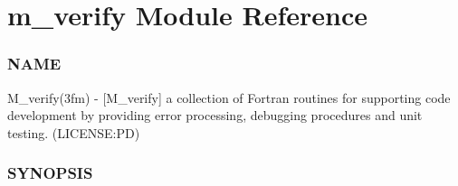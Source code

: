 \hypertarget{namespacem__verify}{}\section{m\+\_\+verify Module Reference}
\label{namespacem__verify}


\subsubsection*{N\+A\+ME}

M\+\_\+verify(3fm) -\/ \mbox{[}M\+\_\+verify\mbox{]} a collection of Fortran routines for supporting code development by providing error processing, debugging procedures and unit testing. (L\+I\+C\+E\+N\+SE\+:PD) \subsubsection*{S\+Y\+N\+O\+P\+S\+IS} 


